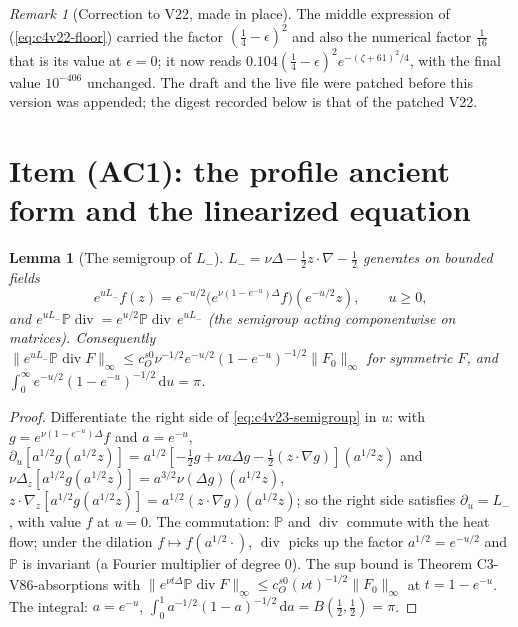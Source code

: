 \documentclass[11pt]{article}
\newcommand{\dd}{\,\mathrm d}
\newcommand{\PP}{\mathbb P}
\theoremstyle{plain}
\newtheorem{lemma}[theorem]{Lemma}
\theoremstyle{definition}
\theoremstyle{remark}
\newtheorem{remark}[theorem]{Remark}
\begin{document}
\begin{remark}[Correction to V22, made in place]
\label{rem:c4v23-correction}
The middle expression of (\ref{eq:c4v22-floor}) carried the factor
\((\frac14-\epsilon)^2\) and also the numerical factor \(\frac1{16}\) that is its value at
\(\epsilon=0\); it now reads \(0.104(\frac14-\epsilon)^2e^{-(\zeta+61)^2/4}\), with the final value \(10^{-406}\)
unchanged.  The draft and the live file were patched before this
version was appended; the digest recorded below is that of the
patched V22.
\end{remark}

\section{Item (AC1): the profile ancient form and the linearized equation}
\label{sec:c4v23-profile}

\begin{lemma}[The semigroup of \(L_-\)]
\label{lem:c4v23-semigroup}
\(L_-=\nu\Delta-\frac12z\cdot\nabla-\frac12\) generates on bounded fields
\begin{equation}
 e^{uL_-}f(z)=e^{-u/2}\bigl(e^{\nu(1-e^{-u})\Delta}f\bigr)(e^{-u/2}z),\qquad u\ge0 ,
 \label{eq:c4v23-semigroup}
\end{equation}
and \(e^{uL_-}\PP\operatorname{div}=e^{u/2}\PP\operatorname{div}\,e^{uL_-}\) (the semigroup acting componentwise on
matrices).  Consequently \(\|e^{uL_-}\PP\operatorname{div}F\|_\infty\le c_O^{s0}\nu^{-1/2}e^{-u/2}(1-e^{-u})^{-1/2}\|F_0\|_\infty\) for
symmetric \(F\), and \(\int_0^\infty e^{-u/2}(1-e^{-u})^{-1/2}\dd u=\pi\).
\end{lemma}

\begin{proof}
Differentiate the right side of \eqref{eq:c4v23-semigroup} in \(u\): with
\(g=e^{\nu(1-e^{-u})\Delta}f\) and \(a=e^{-u}\), \(\partial_u[a^{1/2}g(a^{1/2}z)]=a^{1/2}[-\frac12g+\nu a\Delta g-\frac12(z\cdot\nabla g)](a^{1/2}z)\)
and \(\nu\Delta_z[a^{1/2}g(a^{1/2}z)]=a^{3/2}\nu(\Delta g)(a^{1/2}z)\), \(z\cdot\nabla_z[a^{1/2}g(a^{1/2}z)]=a^{1/2}(z\cdot\nabla g)(a^{1/2}z)\); so
the right side satisfies \(\partial_u=L_-\), with value \(f\) at \(u=0\).  The
commutation: \(\PP\) and \(\operatorname{div}\) commute with the heat flow; under the
dilation \(f\mapsto f(a^{1/2}\cdot)\), \(\operatorname{div}\) picks up the factor \(a^{1/2}=e^{-u/2}\) and \(\PP\)
is invariant (a Fourier multiplier of degree \(0\)).  The sup bound is
Theorem C3-V86-absorptions with \(\|e^{\nu t\Delta}\PP\operatorname{div}F\|_\infty\le c_O^{s0}(\nu t)^{-1/2}\|F_0\|_\infty\) at
\(t=1-e^{-u}\).  The integral: \(a=e^{-u}\), \(\int_0^1a^{-1/2}(1-a)^{-1/2}\dd a=B(\frac12,\frac12)=\pi\).
\end{proof}
\end{document}
